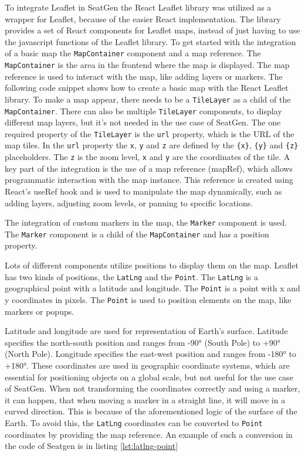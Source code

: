 To integrate Leaflet\cite{LeafletGitHub} in SeatGen the React Leaflet library\cite{ReactLeafletDocs2} was utilized as a wrapper for Leaflet, because of the easier React implementation. The library provides a set of React components for Leaflet maps, instead of just having to use the javascript functions of the Leaflet library. To get started with the integration of a basic map the \texttt{MapContainer} component and a map reference. The \texttt{MapContainer} is the area in the frontend where the map is displayed. The map reference is used to interact with the map, like adding layers or markers. The following code snippet shows how to create a basic map with the React Leaflet library. To make a map appear, there needs to be a \texttt{TileLayer} as a child of the \texttt{MapContainer}. There can also be multiple \texttt{TileLayer} components, to display different map layers, but it's not needed in the use case of SeatGen. The one required property of the \texttt{TileLayer} is the \texttt{url} property, which is the URL of the map tiles. In the \texttt{url} property the \texttt{x}, \texttt{y} and \texttt{z} are defined by the \texttt{\{x\}}, \texttt{\{y\}} and \texttt{\{z\}} placeholders. The \texttt{z} is the zoom level, \texttt{x} and \texttt{y} are the coordinates of the tile. A key part of the integration is the use of a map reference (mapRef), which allows programmatic interaction with the map instance. This reference is created using React’s useRef hook and is used to manipulate the map dynamically, such as adding layers, adjusting zoom levels, or panning to specific locations.

The integration of custom markers in the map, the \texttt{Marker} component is used. The \texttt{Marker} component is a child of the \texttt{MapContainer} and has a position property.

Lots of different components utilize positions to display them on the map. Leaflet has two kinds of positions, the \texttt{LatLng} and the \texttt{Point}. The \texttt{LatLng} is a geographical point with a latitude and longitude. The \texttt{Point} is a point with x and y coordinates in pixels. The \texttt{Point} is used to position elements on the map, like markers or popups. 

Latitude and longitude are used for representation of Earth's surface. Latitude specifies the north-south position and ranges from -90° (South Pole) to +90° (North Pole). Longitude specifies the east-west position and ranges from -180° to +180°. These coordinates are used in geographic coordinate systems, which are essential for positioning objects on a global scale, but not useful for the use case of SeatGen. When not transforming the coordinates correctly and using a marker, it can happen, that when moving a marker in a straight line, it will move in a curved direction. This is because of the aforementioned logic of the surface of the Earth. To avoid this, the \texttt{LatLng} coordinates can be converted to \texttt{Point} coordinates by providing the map reference. An example of such a conversion in the code of Seatgen is in listing \ref{lst:latlng-point}

